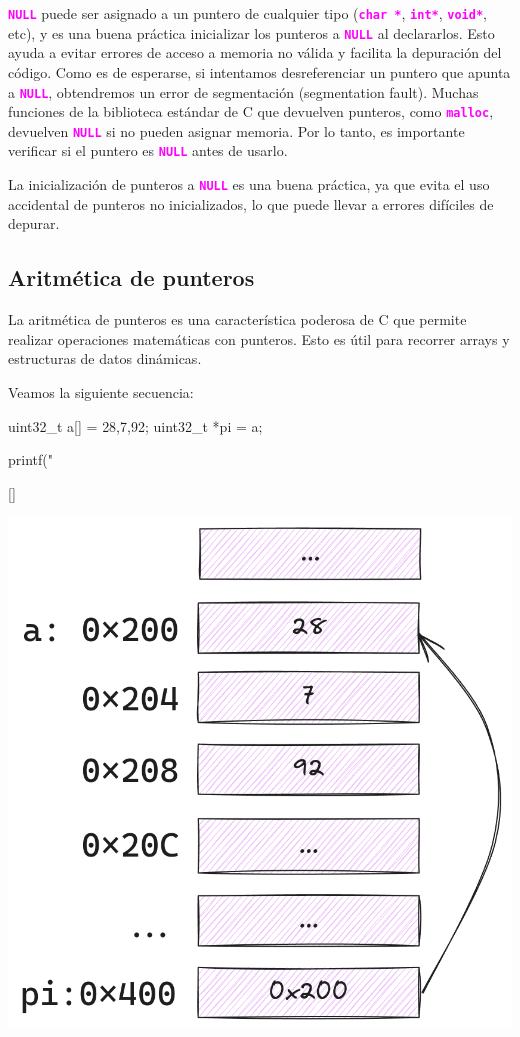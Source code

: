 \documentclass[]{scrartcl}
\newcommand{\hl}[1]{\textcolor{magenta}{\textbf{\texttt{#1}}}}
\begin{document}
\hl{NULL} puede ser asignado a un puntero de cualquier tipo (\hl{char *}, \hl{int*}, \hl{void*}, etc), y es una buena práctica inicializar los punteros a \hl{NULL} al declararlos. Esto ayuda a evitar errores de acceso a memoria no válida y facilita la depuración del código. Como es de esperarse, si intentamos desreferenciar un puntero que apunta a \hl{NULL}, obtendremos un error de segmentación (segmentation fault). Muchas funciones de la biblioteca estándar de C que devuelven punteros, como \hl{malloc}, devuelven \hl{NULL} si no pueden asignar memoria. Por lo tanto, es importante verificar si el puntero es \hl{NULL} antes de usarlo.

La inicialización de punteros a \hl{NULL} es una buena práctica, ya que evita el uso accidental de punteros no inicializados, lo que puede llevar a errores difíciles de depurar.

\subsection*{Aritmética de punteros}

La aritmética de punteros es una característica poderosa de C que permite realizar operaciones matemáticas con punteros. Esto es útil para recorrer arrays y estructuras de datos dinámicas.

Veamos la siguiente secuencia:


\noindent
\begin{minipage}[t]{0.52\textwidth}
\begin{cbox}[]{}
  uint32_t a[] = {28,7,92};
  uint32_t *pi = a;
  
  printf("%
\end{cbox}[]{}
\end{minipage}
\hfill
\begin{minipage}[t]{0.45\textwidth}
  \includegraphics[width=\linewidth]{img/pointers_arith.01.png}
\end{minipage}
\end{document}
